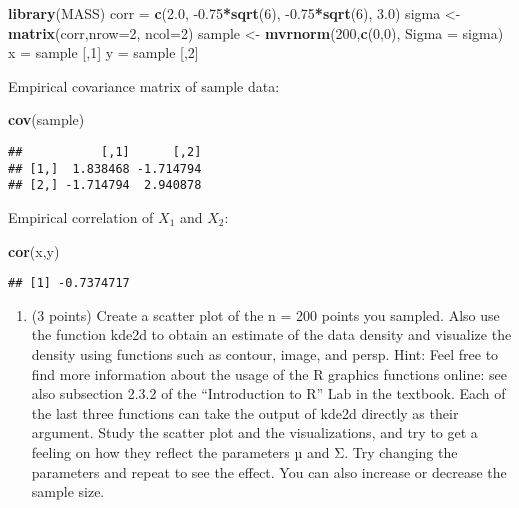 \documentclass[]{article}
\newenvironment{Shaded}{\begin{snugshade}}{\end{snugshade}}
\newcommand{\DataTypeTok}[1]{\textcolor[rgb]{0.13,0.29,0.53}{#1}}
\newcommand{\DecValTok}[1]{\textcolor[rgb]{0.00,0.00,0.81}{#1}}
\newcommand{\FloatTok}[1]{\textcolor[rgb]{0.00,0.00,0.81}{#1}}
\newcommand{\KeywordTok}[1]{\textcolor[rgb]{0.13,0.29,0.53}{\textbf{#1}}}
\newcommand{\NormalTok}[1]{#1}
\newcommand{\OperatorTok}[1]{\textcolor[rgb]{0.81,0.36,0.00}{\textbf{#1}}}
\newcommand{\StringTok}[1]{\textcolor[rgb]{0.31,0.60,0.02}{#1}}
\providecommand{\tightlist}{%
  \setlength{\itemsep}{0pt}\setlength{\parskip}{0pt}}
\begin{document}
\begin{Shaded}
\begin{Highlighting}[]
\KeywordTok{library}\NormalTok{(MASS)}
\NormalTok{corr =}\StringTok{ }\KeywordTok{c}\NormalTok{(}\FloatTok{2.0}\NormalTok{, }\FloatTok{-0.75}\OperatorTok{*}\KeywordTok{sqrt}\NormalTok{(}\DecValTok{6}\NormalTok{), }\FloatTok{-0.75}\OperatorTok{*}\KeywordTok{sqrt}\NormalTok{(}\DecValTok{6}\NormalTok{), }\FloatTok{3.0}\NormalTok{)}
\NormalTok{sigma <-}\StringTok{ }\KeywordTok{matrix}\NormalTok{(corr,}\DataTypeTok{nrow=}\DecValTok{2}\NormalTok{, }\DataTypeTok{ncol=}\DecValTok{2}\NormalTok{)}
\NormalTok{sample <-}\StringTok{ }\KeywordTok{mvrnorm}\NormalTok{(}\DecValTok{200}\NormalTok{,}\KeywordTok{c}\NormalTok{(}\DecValTok{0}\NormalTok{,}\DecValTok{0}\NormalTok{), }\DataTypeTok{Sigma =}\NormalTok{ sigma)}
\NormalTok{x =}\StringTok{ }\NormalTok{sample [,}\DecValTok{1}\NormalTok{]}
\NormalTok{y =}\StringTok{ }\NormalTok{sample [,}\DecValTok{2}\NormalTok{]}
\end{Highlighting}
\end{Shaded}

Empirical covariance matrix of sample data:

\begin{Shaded}
\begin{Highlighting}[]
\KeywordTok{cov}\NormalTok{(sample)}
\end{Highlighting}
\end{Shaded}

\begin{verbatim}
##           [,1]      [,2]
## [1,]  1.838468 -1.714794
## [2,] -1.714794  2.940878
\end{verbatim}

Empirical correlation of \(X_1\) and \(X_2\):

\begin{Shaded}
\begin{Highlighting}[]
\KeywordTok{cor}\NormalTok{(x,y)}
\end{Highlighting}
\end{Shaded}

\begin{verbatim}
## [1] -0.7374717
\end{verbatim}

\begin{enumerate}
\def\labelenumi{\alph{enumi})}
\setcounter{enumi}{1}
\tightlist
\item
  (3 points) Create a scatter plot of the n = 200 points you sampled.
  Also use the function kde2d to obtain an estimate of the data density
  and visualize the density using functions such as contour, image, and
  persp. Hint: Feel free to find more information about the usage of the
  R graphics functions online: see also subsection 2.3.2 of the
  ``Introduction to R'' Lab in the textbook. Each of the last three
  functions can take the output of kde2d directly as their argument.
  Study the scatter plot and the visualizations, and try to get a
  feeling on how they reflect the parameters µ and Σ. Try changing the
  parameters and repeat to see the effect. You can also increase or
  decrease the sample size.
\end{enumerate}
\end{document}
